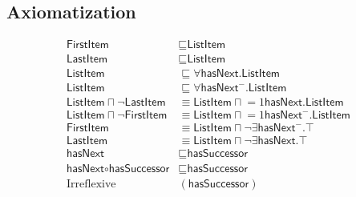 \subsection{Axiomatization}
\label{axs:Sequence,}
\begin{align}
\textsf{FirstItem} &\sqsubseteq \textsf{ListItem} \\
\textsf{LastItem} &\sqsubseteq \textsf{ListItem} \\
\textsf{ListItem} &\sqsubseteq \forall \textsf{hasNext.ListItem} \\
\textsf{ListItem} &\sqsubseteq \forall \textsf{hasNext}^-\textsf{.ListItem} \\
\textsf{ListItem} \sqcap \lnot \textsf{LastItem} &\equiv \textsf{ListItem} \sqcap \mathord{=1}\textsf{hasNext.ListItem} \\
\textsf{ListItem} \sqcap \lnot \textsf{FirstItem} &\equiv \textsf{ListItem} \sqcap \mathord{=1}\textsf{hasNext}^- \textsf{.ListItem} \\
\textsf{FirstItem} &\equiv \textsf{ListItem} \sqcap \lnot \exists \textsf{hasNext}^-\textsf{.}\top \\
\textsf{LastItem} &\equiv \textsf{ListItem} \sqcap \lnot \exists \textsf{hasNext.}\top \\
\textsf{hasNext} &\sqsubseteq \textsf{hasSuccessor} \\
\textsf{hasNext} \circ \textsf{hasSuccessor} &\sqsubseteq \textsf{hasSuccessor} \\
\text{Irreflexive}&(\textsf{hasSuccessor})
\end{align}

